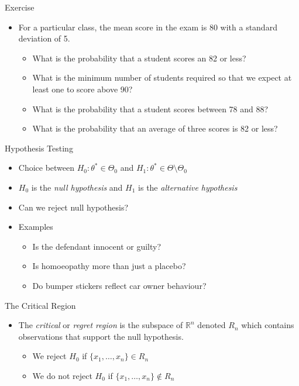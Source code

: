 \documentclass{beamer}
\begin{document}
\begin{frame}{Exercise} 
\begin{itemize} 
 \item For a particular class, the mean score in the exam is 80 with a standard deviation of 5. 
 \begin{itemize}
 \item What is the probability that a student scores an 82 or less? 
 \item What is the minimum number of students required so that we expect at least one to score above 90? 
 \item What is the probability that a student scores between 78 and 88?
 \item What is the probability that an average of three scores is 82 or less?
 \end{itemize} 
\end{itemize}
\end{frame}

\begin{frame}{Hypothesis Testing}  
\begin{itemize} 
\item Choice between $H_0: \theta^* \in \Theta_0$ and $H_1: \theta^* \in \Theta \setminus \Theta_0$
\item $H_0$ is the \emph{null hypothesis} and $H_1$ is the \emph{alternative hypothesis} 
\item Can we reject null hypothesis? 
\item Examples 
\begin{itemize} 
\item Is the defendant innocent or guilty? 
\item Is homoeopathy more than just a placebo? 
\item Do bumper stickers reflect car owner behaviour? 
\end{itemize}
\end{itemize}
\end{frame}

\begin{frame}{The Critical Region} 
\begin{itemize} 
 \item The \emph{critical} or \emph{regret region} is the subspace of $\mathbb{R}^n$ denoted $R_n$ which contains observations that support the null hypothesis.  
 \begin{itemize}
 \item We reject $H_0$ if $\{x_1, \ldots, x_n\} \in R_n$ 
 \item We do not reject $H_0$ if $\{x_1, \ldots, x_n\} \notin R_n$ 
 \end{itemize} 
\end{itemize}
\end{frame}
\end{document}
